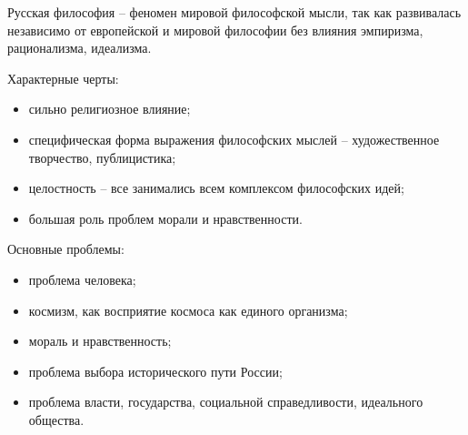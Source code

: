 
Русская философия -- феномен мировой философской мысли, так как развивалась независимо от европейской и мировой философии без влияния эмпиризма, рационализма, идеализма.

Характерные черты:
\begin{itemize}
	\itemsep-1ex
	\item сильно религиозное влияние;
	\item специфическая форма выражения философских мыслей -- художественное творчество, публицистика;
	\item целостность -- все занимались всем комплексом философских идей;
	\item большая роль проблем морали и нравственности.
\end{itemize}

Основные проблемы:
\begin{itemize}
	\itemsep-1ex
	\item проблема человека;
	\item космизм, как восприятие космоса как единого организма;
	\item мораль и нравственность;
	\item проблема выбора исторического пути России;
	\item проблема власти, государства, социальной справедливости, идеального общества.
\end{itemize}

